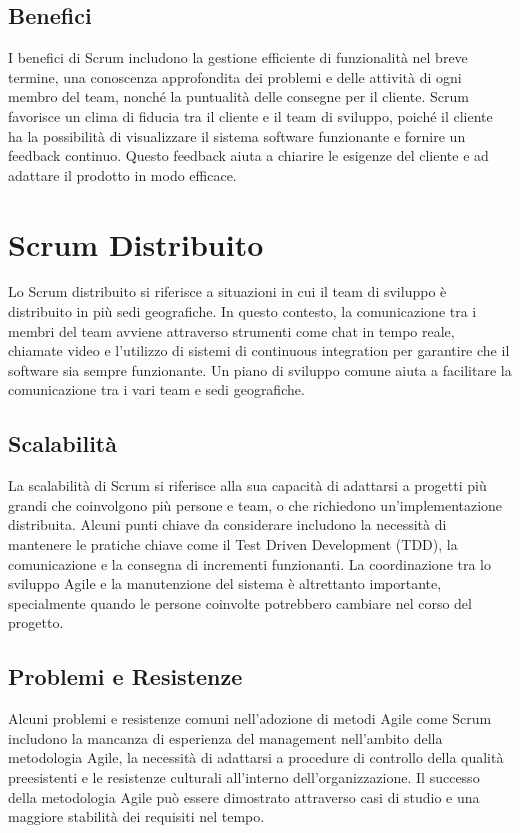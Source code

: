 \subsection{Benefici}
I benefici di Scrum includono la gestione efficiente di funzionalità nel breve termine, una conoscenza approfondita
dei problemi e delle attività di ogni membro del team, nonché la puntualità delle consegne per il cliente. Scrum favorisce
un clima di fiducia tra il cliente e il team di sviluppo, poiché il cliente ha la possibilità di visualizzare il sistema software
funzionante e fornire un feedback continuo. Questo feedback aiuta a chiarire le esigenze del cliente e ad adattare il prodotto
in modo efficace.

\section{Scrum Distribuito}
Lo Scrum distribuito si riferisce a situazioni in cui il team di sviluppo è distribuito in più sedi geografiche. In questo contesto,
la comunicazione tra i membri del team avviene attraverso strumenti come chat in tempo reale, chiamate video e l'utilizzo di sistemi
di continuous integration per garantire che il software sia sempre funzionante. Un piano di sviluppo comune aiuta a facilitare la
comunicazione tra i vari team e sedi geografiche.

\subsection{Scalabilità}
La scalabilità di Scrum si riferisce alla sua capacità di adattarsi a progetti più grandi che coinvolgono più persone e team,
o che richiedono un'implementazione distribuita. Alcuni punti chiave da considerare includono la necessità di mantenere le pratiche
chiave come il Test Driven Development (TDD), la comunicazione e la consegna di incrementi funzionanti. La coordinazione tra lo
sviluppo Agile e la manutenzione del sistema è altrettanto importante, specialmente quando le persone coinvolte potrebbero cambiare
nel corso del progetto.

\subsection{Problemi e Resistenze}
Alcuni problemi e resistenze comuni nell'adozione di metodi Agile come Scrum includono la mancanza di esperienza del management nell'ambito
della metodologia Agile, la necessità di adattarsi a procedure di controllo della qualità preesistenti e le resistenze culturali all'interno
dell'organizzazione. Il successo della metodologia Agile può essere dimostrato attraverso casi di studio e una maggiore stabilità dei requisiti
nel tempo.



